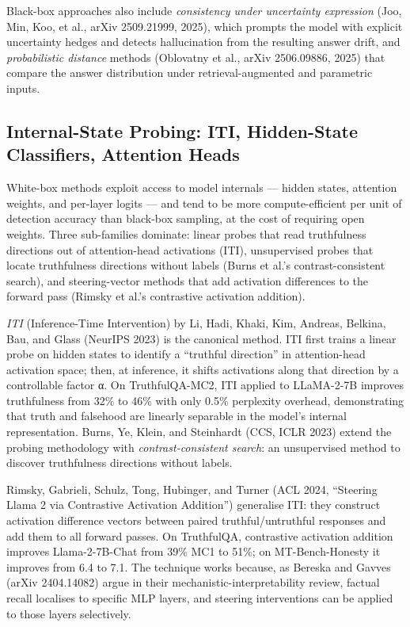 \documentclass{article}
\begin{document}
Black-box approaches also include \emph{consistency under uncertainty expression} (Joo, Min, Koo, et al., arXiv 2509.21999, 2025), which prompts the model with explicit uncertainty hedges and detects hallucination from the resulting answer drift, and \emph{probabilistic distance} methods (Oblovatny et al., arXiv 2506.09886, 2025) that compare the answer distribution under retrieval-augmented and parametric inputs.

\subsection{Internal-State Probing: ITI, Hidden-State Classifiers, Attention Heads}\label{internal-state-probing-iti-hidden-state-classifiers-attention-heads}

White-box methods exploit access to model internals --- hidden states, attention weights, and per-layer logits --- and tend to be more compute-efficient per unit of detection accuracy than black-box sampling, at the cost of requiring open weights. Three sub-families dominate: linear probes that read truthfulness directions out of attention-head activations (ITI), unsupervised probes that locate truthfulness directions without labels (Burns et al.'s contrast-consistent search), and steering-vector methods that add activation differences to the forward pass (Rimsky et al.'s contrastive activation addition).

\emph{ITI} (Inference-Time Intervention) by Li, Hadi, Khaki, Kim, Andreas, Belkina, Bau, and Glass (NeurIPS 2023) is the canonical method. ITI first trains a linear probe on hidden states to identify a ``truthful direction'' in attention-head activation space; then, at inference, it shifts activations along that direction by a controllable factor α. On TruthfulQA-MC2, ITI applied to LLaMA-2-7B improves truthfulness from 32\% to 46\% with only 0.5\% perplexity overhead, demonstrating that truth and falsehood are linearly separable in the model's internal representation. Burns, Ye, Klein, and Steinhardt (CCS, ICLR 2023) extend the probing methodology with \emph{contrast-consistent search}: an unsupervised method to discover truthfulness directions without labels.

Rimsky, Gabrieli, Schulz, Tong, Hubinger, and Turner (ACL 2024, ``Steering Llama 2 via Contrastive Activation Addition'') generalise ITI: they construct activation difference vectors between paired truthful/untruthful responses and add them to all forward passes. On TruthfulQA, contrastive activation addition improves Llama-2-7B-Chat from 39\% MC1 to 51\%; on MT-Bench-Honesty it improves from 6.4 to 7.1. The technique works because, as Bereska and Gavves (arXiv 2404.14082) argue in their mechanistic-interpretability review, factual recall localises to specific MLP layers, and steering interventions can be applied to those layers selectively.
\end{document}
